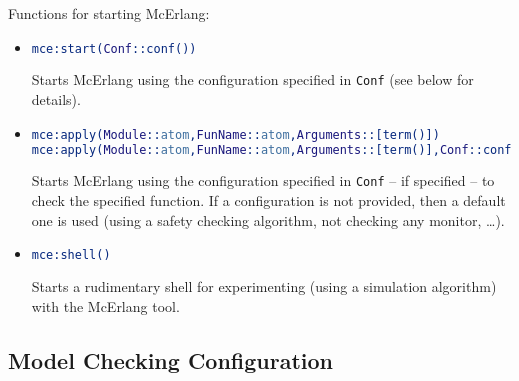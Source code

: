 \documentclass[a4paper]{article}
\begin{document}
Functions for starting McErlang:
\begin{itemize}
\item
\begin{lstlisting}[language=Erlang]
mce:start(Conf::conf())
\end{lstlisting}
Starts McErlang using the configuration specified in \lstinline{Conf}
(see below for details).

\item
\begin{lstlisting}[language=Erlang]
mce:apply(Module::atom,FunName::atom,Arguments::[term()])
mce:apply(Module::atom,FunName::atom,Arguments::[term()],Conf::conf())
\end{lstlisting}
Starts McErlang using the configuration specified in \lstinline{Conf} --
if specified -- to check the specified function.
If a configuration is not provided, then a default one is used
(using a safety checking algorithm, not checking any monitor, \ldots).

\item
\begin{lstlisting}[language=Erlang]
mce:shell()
\end{lstlisting}
Starts a rudimentary shell for experimenting (using a simulation algorithm) 
with the McErlang tool. 
\end{itemize}

\subsection{Model Checking Configuration}
\label{configuration}
\end{document}
